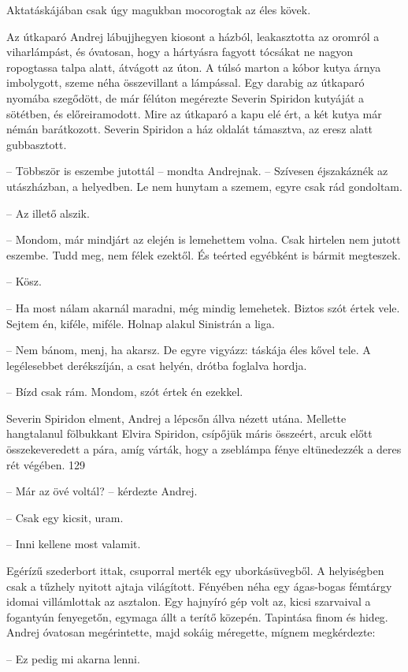 \documentclass{IEEEtran}
\begin{document}
Aktatáskájában csak úgy magukban mocorogtak az éles kövek.

Az útkaparó Andrej lábujjhegyen kiosont a házból, leakasztotta az oromról a
viharlámpást, és óvatosan, hogy a hártyásra fagyott tócsákat ne nagyon
ropogtassa talpa alatt, átvágott az úton. A túlsó marton a kóbor kutya árnya
imbolygott, szeme néha összevillant a lámpással. Egy darabig az útkaparó
nyomába szegődött, de már félúton megérezte Severin Spiridon kutyáját a
sötétben, és előreiramodott. Mire az útkaparó a kapu elé ért, a két kutya már
némán barátkozott. Severin Spiridon a ház oldalát támasztva, az eresz alatt
gubbasztott.

– Többször is eszembe jutottál – mondta Andrejnak. – Szívesen éjszakáznék az
utászházban, a helyedben. Le nem hunytam a szemem, egyre csak rád gondoltam.

– Az illető alszik.

– Mondom, már mindjárt az elején is lemehettem volna. Csak hirtelen nem jutott
eszembe. Tudd meg, nem félek ezektől. És teérted egyébként is bármit
megteszek.

– Kösz.

– Ha most nálam akarnál maradni, még mindig lemehetek. Biztos szót értek vele.
Sejtem én, kiféle, miféle. Holnap alakul Sinistrán a liga.

– Nem bánom, menj, ha akarsz. De egyre vigyázz: táskája éles kővel tele. A
legélesebbet derékszíján, a csat helyén, drótba foglalva hordja.

– Bízd csak rám. Mondom, szót értek én ezekkel.

Severin Spiridon elment, Andrej a lépcsőn állva nézett utána. Mellette
hangtalanul fölbukkant Elvira Spiridon, csípőjük máris összeért, arcuk előtt
összekeveredett a pára, amíg várták, hogy a zseblámpa fénye eltünedezzék a
deres rét végében.
129

– Már az övé voltál? – kérdezte Andrej.

– Csak egy kicsit, uram.

– Inni kellene most valamit.

Egérízű szederbort ittak, csuporral merték egy uborkásüvegből. A helyiségben
csak a tűzhely nyitott ajtaja világított. Fényében néha egy ágas-bogas
fémtárgy idomai villámlottak az asztalon. Egy hajnyíró gép volt az, kicsi
szarvaival a fogantyún fenyegetőn, egymaga állt a terítő közepén. Tapintása
finom és hideg. Andrej óvatosan megérintette, majd sokáig méregette, mígnem
megkérdezte:

– Ez pedig mi akarna lenni.
\end{document}
